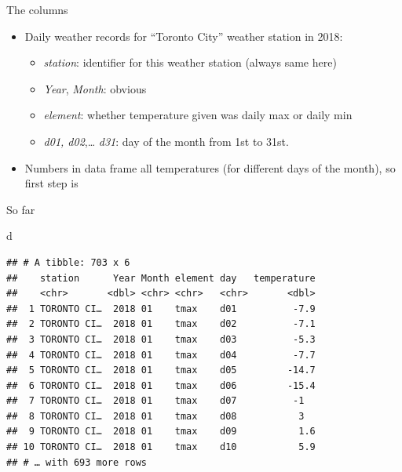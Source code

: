 \documentclass[ignorenonframetext,]{beamer}
\newenvironment{Shaded}{\begin{snugshade}}{\end{snugshade}}
\newcommand{\DataTypeTok}[1]{\textcolor[rgb]{0.13,0.29,0.53}{#1}}
\newcommand{\KeywordTok}[1]{\textcolor[rgb]{0.13,0.29,0.53}{\textbf{#1}}}
\newcommand{\NormalTok}[1]{#1}
\newcommand{\OperatorTok}[1]{\textcolor[rgb]{0.81,0.36,0.00}{\textbf{#1}}}
\newcommand{\StringTok}[1]{\textcolor[rgb]{0.31,0.60,0.02}{#1}}
\providecommand{\tightlist}{%
  \setlength{\itemsep}{0pt}\setlength{\parskip}{0pt}}
\begin{document}
\begin{frame}[fragile]{The columns}
\protect\hypertarget{the-columns}{}

\begin{itemize}
\item
  Daily weather records for ``Toronto City'' weather station in 2018:

  \begin{itemize}
  \tightlist
  \item
    \emph{station}: identifier for this weather station (always same
    here)
  \item
    \emph{Year}, \emph{Month}: obvious
  \item
    \emph{element}: whether temperature given was daily max or daily min
  \item
    \emph{d01, d02},\ldots{} \emph{d31}: day of the month from 1st to
    31st.
  \end{itemize}
\item
  Numbers in data frame all temperatures (for different days of the
  month), so first step is
\end{itemize}

\begin{Shaded}
\end{Shaded}

\end{frame}

\begin{frame}[fragile]{So far}
\protect\hypertarget{so-far}{}

\begin{Shaded}
\begin{Highlighting}[]
\NormalTok{d}
\end{Highlighting}
\end{Shaded}

\begin{verbatim}
## # A tibble: 703 x 6
##    station      Year Month element day   temperature
##    <chr>       <dbl> <chr> <chr>   <chr>       <dbl>
##  1 TORONTO CI…  2018 01    tmax    d01          -7.9
##  2 TORONTO CI…  2018 01    tmax    d02          -7.1
##  3 TORONTO CI…  2018 01    tmax    d03          -5.3
##  4 TORONTO CI…  2018 01    tmax    d04          -7.7
##  5 TORONTO CI…  2018 01    tmax    d05         -14.7
##  6 TORONTO CI…  2018 01    tmax    d06         -15.4
##  7 TORONTO CI…  2018 01    tmax    d07          -1  
##  8 TORONTO CI…  2018 01    tmax    d08           3  
##  9 TORONTO CI…  2018 01    tmax    d09           1.6
## 10 TORONTO CI…  2018 01    tmax    d10           5.9
## # … with 693 more rows
\end{verbatim}

\end{frame}
\end{document}
